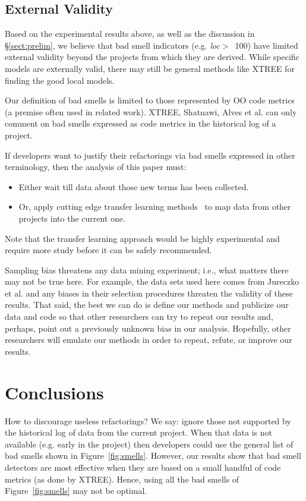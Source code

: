\documentclass[twocolumn,5p]{elsarticle}
\newcommand{\tion}[1]{\S\ref{sect:#1}}
\newcommand{\fig}[1]{Figure~\ref{fig:#1}}
\theoremstyle{break}
\begin{document}
\begin{itemize}
		\subsection{External Validity}
		Based on the experimental results above,
		as well as the discussion in \tion{prelim},
		we believe that bad smell indicators (e.g. \mbox{{\em loc}$>$ 100})
		have limited external validity beyond the projects from which they are derived. 
		While specific models are externally valid,
		there may still be general methods like XTREE for finding the good local models.  
		
		
		Our definition of bad smells is limited to those represented by OO code metrics (a premise often used in related work).   
		XTREE, Shatnawi, Alves et al. can  only comment
		on bad smells   expressed as code metrics 
		  in the historical log of a project. 
		
		
		If developers want to justify their refactorings
		via bad smells expressed in other terminology,
		then the  analysis of this paper must:
		\begin{itemize}
		    \item Either wait till 
		data about those new
		terms has been collected. 
		\item Or, apply cutting edge transfer learning
		methods~\cite{Nam15,Jing15} to map data from other projects
		into the current one.
		\end{itemize}
		Note that the transfer learning approach would
		be highly experimental and require more study
		before it can be safely recommended.
		
		Sampling bias threatens any data mining experiment; i.e., what matters
		there may not be true here. For example, the data sets used here comes from Jureczko et al. and any biases in their selection procedures
		threaten the validity of these results. 
		That said,
		the best we can do is define our methods and publicize our data and code so that other researchers can
		try to repeat our results and, perhaps, point out a previously unknown bias
		in our analysis. Hopefully, other researchers will emulate our methods in
		order to repeat, refute, or improve our results. 
		
		
		
		\section{Conclusions}
		How to discourage useless refactorings?
		We say: ignore those not supported by the historical log of data from
		the current project.  
		When that data is not available (e.g. early
		in the project) then developers could use the general list of
		bad smells shown in \fig{smells}. However, 
		our results
		show that  bad smell detectors are most
		effective when they are based
		on a small handful of code metrics (as done by XTREE).
		Hence, using all the bad smells of \fig{smells} may not be optimal. 
		

\end{itemize}
\end{document}
